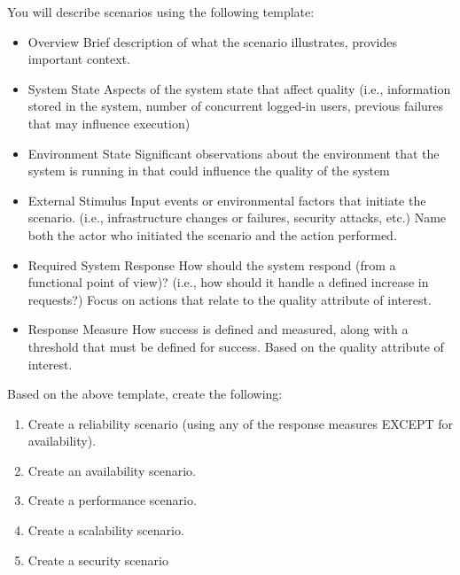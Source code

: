 You will describe scenarios using the following template:
\begin{itemize}
	\item  Overview
	      \subitem  Brief description of what the scenario illustrates, provides important context.
	\item  System State
	      \subitem  Aspects of the system state that affect quality (i.e., information stored in the
	      system, number of concurrent logged-in users, previous failures that may
	      influence execution)
	\item  Environment State
	      \subitem  Significant observations about the environment that the system is running in that
	      could influence the quality of the system
	\item  External Stimulus
	      \subitem  Input events or environmental factors that initiate the scenario. (i.e., infrastructure
	      changes or failures, security attacks, etc.)
	      \subitem  Name both the actor who initiated the scenario and the action performed.
	\item  Required System Response
	      \subitem  How should the system respond (from a functional point of view)? (i.e., how
	      should it handle a defined increase in requests?)
	      \subitem  Focus on actions that relate to the quality attribute of interest.
	\item  Response Measure
	      \subitem  How success is defined and measured, along with a threshold that must be
	      defined for success.
	      \subitem  Based on the quality attribute of interest.
\end{itemize}
Based on the above template, create the following:
\begin{enumerate}
	\item Create a reliability scenario (using any of the response measures EXCEPT for availability).
	\item Create an availability scenario.
	\item Create a performance scenario.
	\item Create a scalability scenario.
	\item Create a security scenario
\end{enumerate}
\pagebreak
